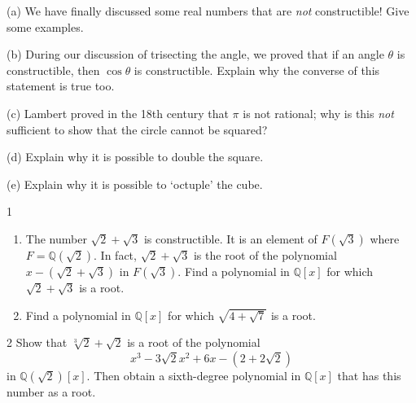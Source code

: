 \begin{problem}[Warmup]{(a)}
    We have finally discussed some real numbers that are \emph{not} constructible! Give some examples.
\end{problem}
\unsolved

\begin{problem}[Warmup]{(b)}
    During our discussion of trisecting the angle, we proved that if an angle $\theta$ is constructible, then $\cos\theta$ is constructible. Explain why the converse of this statement is true too.
\end{problem}
\unsolved

\begin{problem}[Warmup]{(c)}
    Lambert proved in the 18th century that $\pi$ is not rational; why is this \emph{not} sufficient to show that the circle cannot be squared?
\end{problem}
\unsolved

\begin{problem}[Warmup]{(d)}
    Explain why it is possible to double the square.
\end{problem}
\unsolved

\begin{problem}[Warmup]{(e)}
    Explain why it is possible to `octuple' the cube.
\end{problem}
\unsolved

\begin{problem}{1}
    \begin{enumerate}
        \item[(a)] The number $\sqrt{2} + \sqrt{3}$ is constructible. It is an element of
        $F(\sqrt{3})$ where $F = \mathbb{Q}(\sqrt{2})$. In fact, $\sqrt{2} + \sqrt{3}$ is
        the root of the polynomial $x - (\sqrt{2} + \sqrt{3})$ in $F(\sqrt{3})$. Find a
        polynomial in $\mathbb{Q}[x]$ for which $\sqrt{2} + \sqrt{3}$ is a root.
        \item[(b)] Find a polynomial in $\mathbb{Q}[x]$ for which $\sqrt{4 + \sqrt{7}}$ is
        a root.
    \end{enumerate}
\end{problem}
\unsolved

\begin{problem}{2}
    Show that $\sqrt[3]{2} + \sqrt{2}$ is a root of the polynomial
    \[x^3 - 3\sqrt{2}x^2 + 6x - (2 + 2\sqrt{2})\]
    in $\mathbb{Q}(\sqrt{2})[x]$. Then obtain a sixth-degree polynomial in $\mathbb{Q}[x]$
    that has this number as a root.
\end{problem}
\unsolved


